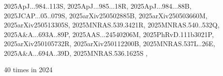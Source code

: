 \documentclass[12pt]{article}
\begin{document}
\begin{description}
{2025ApJ...984..113S,%
2025ApJ...985...18R,%
2025ApJ...984...88B,%
2025JCAP...05..079S,%
2025arXiv250502885B,%
2025arXiv250503660M,%
2025arXiv250513305S,%
2025MNRAS.539.3421R,%
2025MNRAS.540..532Q,%
2025A&A...693A..89P,%
2025AAS...24540206M,%
2025PhRvD.111b3021P,%
2025arXiv250105732R,%
2025arXiv250112200B,%
2025MNRAS.537L..26E,%
2025A&A...694A..39D,%
2025MNRAS.536.1625S%
}, \item %
40 times in 2024 \citep{
2024GMS...283..179C,%
BB24,
2024AGUFMSH13B2928M,%
2024arXiv241112953Z,%
2024PhFl...36k5152L,%
2024ApJ...975..251V,%
}
\end{description}
\end{document}
